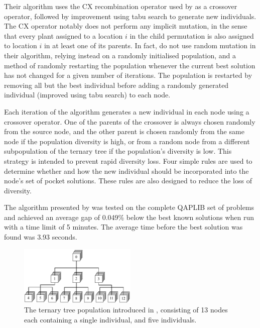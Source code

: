 {	Their algorithm uses the CX recombination operator used by \citet{Merz:2000ek} as a crossover operator, followed by improvement using tabu search to generate new individuals.
	The CX operator notably does not perform any implicit mutation, in the sense that every plant assigned to a location \(i\) in the child permutation is also assigned to location \(i\) in at least one of its parents.
	In fact, \citeauthor{Harris:2015kw} do not use random mutation in their algorithm, relying instead on a randomly initialised population, and a method of randomly restarting the population whenever the current best solution has not changed for a given number of iterations. The population is restarted by removing all but the best individual before adding a randomly generated individual (improved using tabu search) to each node.

	Each iteration of the algorithm generates a new individual in each node using a crossover operator. One of the parents of the crossover is always chosen randomly from the source node, and the other parent is chosen randomly from the same node if the population diversity is high, or from a random node from a different subpopulation of the ternary tree if the population's diversity is low. This strategy is intended to prevent rapid diversity loss. Four simple rules are used to determine whether and how the new individual should be incorporated into the node's set of pocket solutions. These rules are also designed to reduce the loss of diversity.

	The algorithm presented by \citeauthor{Harris:2015kw} was tested on the complete QAPLIB set of problems and achieved an average gap of 0.049\% below the best known solutions when run with a time limit of 5 minutes. The average time before the best solution was found was 3.93 seconds.

	\begin{figure}
		\centering
		\includegraphics[width=0.5\textwidth]{resources/ternary-tree.pdf}%
		\caption{The ternary tree population introduced in \citet{Inostroza:2008md}, consisting of 13 nodes each containing a single  individual, and five  individuals.}
		\label{fig:ternary-tree}
	\end{figure}


}
